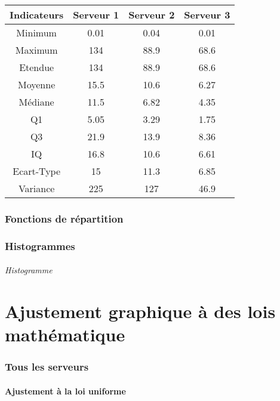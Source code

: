 \documentclass{article}
\begin{document}
\begin{tabular}{|c|c|c|c|}
  \hline
  Indicateurs & Serveur 1 & Serveur 2 & Serveur 3 \\
  \hline
  Minimum & 0.01 & 0.04 & 0.01 \\
  Maximum & 134 & 88.9 & 68.6 \\
  Etendue & 134 & 88.9 & 68.6 \\
  Moyenne & 15.5 & 10.6 & 6.27 \\
  Médiane & 11.5 & 6.82 & 4.35 \\
  Q1 & 5.05 & 3.29 & 1.75 \\
  Q3 & 21.9 & 13.9 & 8.36 \\
  IQ & 16.8 & 10.6 & 6.61 \\
  Ecart-Type & 15 & 11.3 & 6.85 \\
  Variance & 225 & 127 & 46.9 \\
  \hline
\end{tabular}

\section{Fonctions de répartition}

\section{Histogrammes}

\paragraph{Histogramme}
\begin{center}
\end{center}
\paragraph{}

\part{Ajustement graphique à des lois mathématique}

\section{Tous les serveurs}

\subsection{Ajustement à la loi uniforme}
\end{document}

